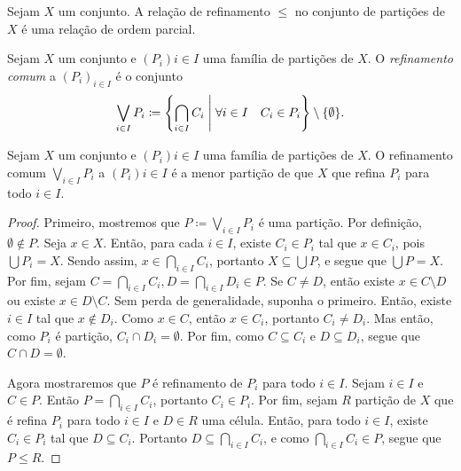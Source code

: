 \begin{prop}
Sejam $X$ um conjunto. A relação de refinamento $\leq$ no conjunto de partições de $X$ é uma relação de ordem parcial.
\end{prop}

\begin{defi}
Sejam $X$ um conjunto e $(P_i){i \in I}$ uma família de partições de $X$. O \emph{refinamento comum} a $(P_i)_{i \in I}$ é o conjunto
	\begin{equation*}
	\bigvee_{i \in I} P_i \coloneqq \set{\bigcap_{i \in I} C_i}{\forall i \in I\quad C_i \in P_i} \setminus \{\emptyset\}.
	\end{equation*}
\end{defi}

\begin{prop}
Sejam $X$ um conjunto e $(P_i){i \in I}$ uma família de partições de $X$. O refinamento comum $\bigvee_{i \in I} P_i$ a $(P_i){i \in I}$ é a menor partição de que $X$ que refina $P_i$ para todo $i \in I$.
\end{prop}
\begin{proof}
Primeiro, mostremos que $P \coloneqq \bigvee_{i \in I} P_i$ é uma partição. Por definição, $\emptyset \notin P$. Seja $x \in X$. Então, para cada $i \in I$, existe $C_i \in P_i$ tal que $x \in C_i$, pois $\bigcup P_i = X$. Sendo assim, $x \in \bigcap_{i \in I} C_i$, portanto $X \subseteq \bigcup P$, e segue que $\bigcup P = X$. Por fim, sejam $C=\bigcap_{i \in I} C_i, D=\bigcap_{i \in I} D_i \in P$. Se $C \neq D$, então existe $x \in C\setminus D$ ou existe $x \in D \setminus C$. Sem perda de generalidade, suponha o primeiro. Então, existe $i \in I$ tal que $x \notin D_i$. Como $x \in C$, então $x \in C_i$, portanto $C_i \neq D_i$. Mas então, como $P_i$ é partição, $C_i \cap D_i = \emptyset$. Por fim, como $C \subseteq C_i$ e $D \subseteq D_i$, segue que $C \cap D = \emptyset$.

Agora mostraremos que $P$ é refinamento de $P_i$ para todo $i \in I$. Sejam $i \in I$ e $C \in P$. Então $P=\bigcap_{i \in I} C_i$, portanto $C_i \in P_i$. Por fim, sejam $R$ partição de $X$ que é refina $P_i$ para todo $i \in I$ e $D \in R$ uma célula. Então, para todo $i \in I$, existe $C_i \in P_i$ tal que $D \subseteq C_i$. Portanto $D \subseteq \bigcap_{i \in I} C_i$, e como $\bigcap_{i \in I} C_i \in P$, segue que $P \leq R$.
\end{proof}

